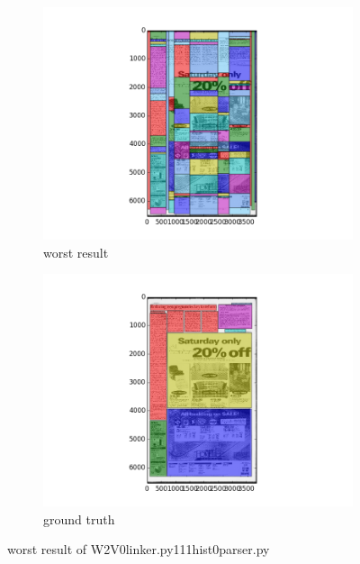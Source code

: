\documentclass[a4paper,10pt]{article}
\begin{document}
					\begin{figure}
					\centering
					\begin{subfigure}{.5\textwidth}
					  \centering
					  \includegraphics[width=10cm]
					{W2V0linker.py111hist0parser.py.worst.png}
					  \caption{worst result}
					  \label{fig:sub1}
					\end{subfigure}%
					\begin{subfigure}{.5\textwidth}
					  \centering
					  \includegraphics[width=10cm]
					{W2V0linker.py111hist0parser.py.gt.worst.png}
					  \caption{ground truth}
					  \label{fig:sub2}
					\end{subfigure}
					\caption
					{worst result of W2V0linker.py111hist0parser.py}
					\label{fig:test}
					\end{figure}
					
\end{document}
